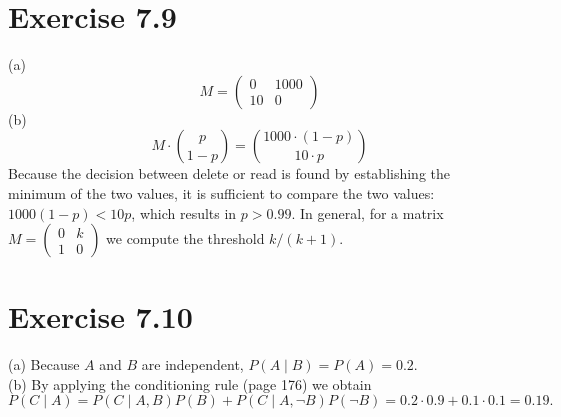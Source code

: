\documentclass[10pt]{book}
\begin{document}
\section{Exercise 7.9}
(a)
\[
M=\begin{pmatrix}
0 & 1000 \\
10 & 0
\end{pmatrix}
\]
(b)
\[
M \cdot\binom{p}{1-p}=\binom{1000 \cdot(1-p)}{10 \cdot p}
\]
Because the decision between delete or read is found by establishing the minimum of the two values, it is sufficient to compare the two values: $1000(1-p)<10 p$, which results in $p>0.99$. In general, for a matrix $M=\begin{pmatrix}0 & k \\ 1 & 0\end{pmatrix}$ we compute the threshold $k /(k+1)$.

\section{Exercise 7.10}
(a) Because $A$ and $B$ are independent, $P(A \mid B)=P(A)=0.2$.\\
(b) By applying the conditioning rule (page 176) we obtain
\[
P(C \mid A)=P(C \mid A, B) P(B)+P(C \mid A, \neg B) P(\neg B)=0.2 \cdot 0.9+0.1 \cdot 0.1=0.19.
\]
\end{document}
